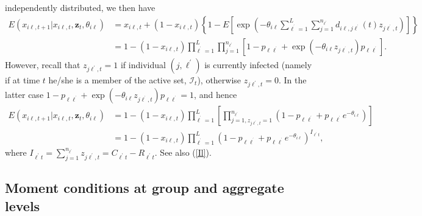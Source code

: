 \documentclass[12pt]{article}
\begin{document}
independently distributed, we then have%
\begin{align*}
E\left(  x_{i\ell,t+1}|x_{i\ell,t},\mathbf{z}_{t},\theta_{i\ell}\right)   &
=x_{i\ell,t}+\left(  1-x_{i\ell,t}\right)  \left\{  1-E\left[  \exp\left(
-\theta_{i\ell}\sum_{\ell^{^{\prime}}=1}^{L}\sum_{j=1}^{n_{\ell^{\prime}}%
}d_{i\ell,j\ell^{^{\prime}}}\left(  t\right)  z_{j\ell^{^{\prime}},t}\right)
\right]  \right\} \\
&  =1-\left(  1-x_{i\ell,t}\right)  \prod_{\ell^{^{\prime}}=1}^{L}\prod
_{j=1}^{n_{\ell^{\prime}}}\left[  1-p_{\ell\ell^{^{\prime}}}+\exp\left(
-\theta_{i\ell}z_{j\ell^{^{\prime}},t}\right)  p_{\ell\ell^{^{\prime}}%
}\right]  .
\end{align*}
However, recall that $z_{j\ell^{\prime},t}=1$ if individual $\left(
j,\ell^{\prime}\right)  $ is currently infected (namely if at time $t$ he/she
is a member of the active set, $\mathcal{I}_{t}$), otherwise $z_{j\ell
^{\prime},t}=0$. In the latter case $1-p_{\ell\ell^{^{\prime}}}+\exp\left(
-\theta_{i\ell}z_{j\ell^{^{\prime}},t}\right)  p_{\ell\ell^{^{\prime}}}=1$,
and hence
\begin{align}
E\left(  x_{i\ell,t+1}|x_{i\ell,t},\mathbf{z}_{t},\theta_{i\ell}\right)   &
=1-\left(  1-x_{i\ell,t}\right)  \prod_{\ell^{^{\prime}}=1}^{L}\left[
\prod_{j=1,z_{j\ell^{\prime},t}=1}^{n_{\ell^{\prime}}}\left(  1-p_{\ell
\ell^{^{\prime}}}+p_{\ell\ell^{^{\prime}}}e^{-\theta_{i\ell}}\right)  \right]
\nonumber\\
&  =1-\left(  1-x_{i\ell,t}\right)  \prod_{\ell^{^{\prime}}=1}^{L}\left(
1-p_{\ell\ell^{^{\prime}}}+p_{\ell\ell^{^{\prime}}}e^{-\theta_{i\ell}}\right)
^{I_{\ell^{\prime}t}}, \label{MomInfi}%
\end{align}
where $I_{\ell^{\prime}t}=\sum_{j=1}^{n_{\ell^{\prime}}}z_{j\ell^{\prime}%
,t}=C_{\ell^{\prime}t}-R_{\ell^{\prime}t}$. See also (\ref{Il}).

\subsection{Moment conditions at group and aggregate levels}
\end{document}
